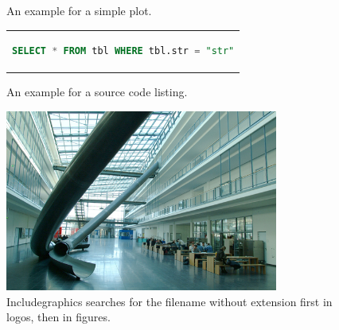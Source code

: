 \begin{figure}[htpb]
    \centering

    \exampleA
    \exampleB
    \caption[Example plot]{An example for a simple plot.}\label{fig:sample-plot}
\end{figure}

\begin{figure}[htpb]
    \centering
    \begin{tabular}{c}
        \begin{lstlisting}[language=SQL]
    SELECT * FROM tbl WHERE tbl.str = "str"
  \end{lstlisting}
    \end{tabular}
    \caption[Example listing]{An example for a source code listing.}\label{fig:sample-listing}
\end{figure}

\begin{figure}[htpb]
    \centering
    \includegraphics[width=0.8\textwidth]{figures/tum.jpg}
    \caption[Something else can be written here for listing this, otherwise the caption will be written!]{Includegraphics searches for the filename without extension first in logos, then in figures.} \label{fig:tum}
\end{figure}

